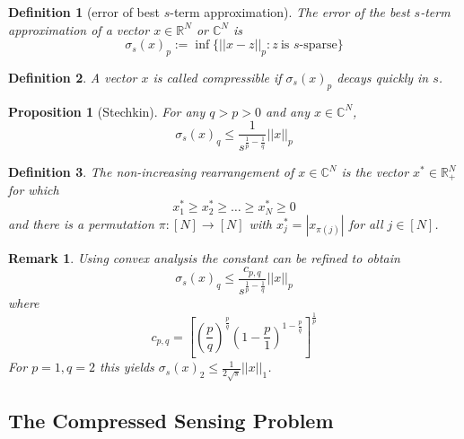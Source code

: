 \documentclass[10pt,a4paper]{article}
\theoremstyle{thmstyle}
\newtheorem{definition}{Definition}
\newtheorem{proposition}{Proposition}
\newtheorem{remark}{Remark}
\begin{document}
\begin{definition}[error of best $s$-term approximation]
  The error of the best $s$-term approximation of a vector $x \in \mathbb{R}^{N}$ or $\mathbb{C}^{N}$ is
  \begin{equation*}
    \sigma_{s}(x)_{p} := \inf \{ ||x - z||_{p} : z~\text{is $s$-sparse} \}
  \end{equation*}
\end{definition}

\begin{definition}
  A vector $x$ is called \emph{compressible} if $\sigma_{s}(x)_{p}$ decays quickly in $s$.
\end{definition}

\begin{proposition}[Stechkin]
  For any $q > p > 0$ and any $x \in \mathbb{C}^{N}$,
  \begin{equation*}
    \sigma_{s}(x)_{q} \le \frac{1}{s^{\frac{1}{p} - \frac{1}{q}}} ||x||_{p}
  \end{equation*}
\end{proposition}

\begin{definition}
  The \emph{non-increasing rearrangement} of $x \in \mathbb{C}^{N}$ is the vector $x^{*} \in \mathbb{R}_{+}^{N}$ for which
  \begin{equation*}
    x_{1}^{*} \ge x_{2}^{*} \ge \dots \ge x_{N}^{*} \ge 0
  \end{equation*}
  and there is a permutation $\pi : [N] \rightarrow [N]$ with $x_{j}^{*} = |x_{\pi(j)}|$ for all $j \in [N]$.
\end{definition}

\begin{remark}
  Using convex analysis the constant can be refined to obtain
  \begin{equation*}
    \sigma_{s}(x)_{q} \le \frac{c_{p,q}}{s^{\frac{1}{p} - \frac{1}{q}}} ||x||_{p}
  \end{equation*}
  where
  \begin{equation*}
    c_{p,q} = \left[ \left( \frac{p}{q} \right)^{\frac{p}{q}} \left( 1 - \frac{p}{1} \right)^{1 - \frac{p}{q}} \right]^{\frac{1}{p}}
  \end{equation*}
  For $p = 1, q = 2$ this yields $\sigma_{s}(x)_{2} \le \frac{1}{2\sqrt{s}} ||x||_{1}$.
\end{remark}

\subsection{The Compressed Sensing Problem}
\end{document}
